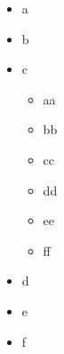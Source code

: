 \documentclass[12pt,ngerman,parskip=half]{scrartcl}
\begin{document}
\blindtext


\begin{itemize}
	\item a
	\item b
	\item c
\begin{itemize}
	\item aa
	\item bb
	\item cc
	\item dd
	\item ee
	\item ff
\end{itemize}
	\item d
	\item e
	\item f
\end{itemize}

\blindtext
\end{document}
